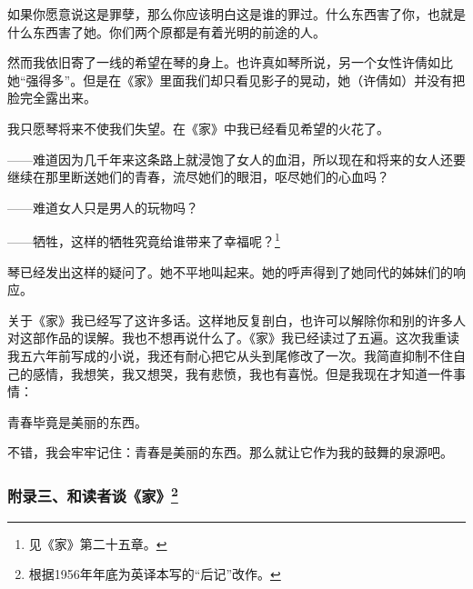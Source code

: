 \par 如果你愿意说这是罪孽，那么你应该明白这是谁的罪过。什么东西害了你，也就是什么东西害了她。你们两个原都是有着光明的前途的人。
\par 然而我依旧寄了一线的希望在琴的身上。也许真如琴所说，另一个女性许倩如比她“强得多”。但是在《家》里面我们却只看见影子的晃动，她（许倩如）并没有把脸完全露出来。
\par 我只愿琴将来不使我们失望。在《家》中我已经看见希望的火花了。
\par ——难道因为几千年来这条路上就浸饱了女人的血泪，所以现在和将来的女人还要继续在那里断送她们的青春，流尽她们的眼泪，呕尽她们的心血吗？
\par ——难道女人只是男人的玩物吗？
\par ——牺牲，这样的牺牲究竟给谁带来了幸福呢？\footnote{见《家》第二十五章。}
\par 琴已经发出这样的疑问了。她不平地叫起来。她的呼声得到了她同代的姊妹们的响应。
\par 关于《家》我已经写了这许多话。这样地反复剖白，也许可以解除你和别的许多人对这部作品的误解。我也不想再说什么了。《家》我已经读过了五遍。这次我重读我五六年前写成的小说，我还有耐心把它从头到尾修改了一次。我简直抑制不住自己的感情，我想笑，我又想哭，我有悲愤，我也有喜悦。但是我现在才知道一件事情：
\par 青春毕竟是美丽的东西。
\par 不错，我会牢牢记住：青春是美丽的东西。那么就让它作为我的鼓舞的泉源吧。
\par {}
\par {}



\subsubsection*{附录三、和读者谈《家》\footnote{根据1956年年底为英译本写的“后记”改作。}}


